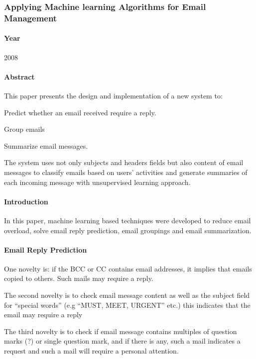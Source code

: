\documentclass[12pt]{article}
\newenvironment{my_itemize}
{\begin{itemize}
  \setlength{\itemsep}{0cm}
  \setlength{\parskip}{0cm}}
{\end{itemize}}
\begin{document}

\subsubsection{Applying Machine learning Algorithms for Email Management \cite{mous03}}
\paragraph{Year} 2008

\paragraph{Abstract}
This paper presents the design and implementation of a new system to:
\begin{my_itemize}
 \item Predict whether an email received require a reply.
 \item Group emails
 \item Summarize email messages.
\end{my_itemize}
The system uses not only subjects and headers fields but also content of email messages to classify emails based on users’ activities and generate summaries of each incoming message with unsupervised learning approach.

\paragraph{Introduction}
\begin{my_itemize}
 \item In this paper, machine learning based techniques were developed to reduce email overload, solve email  reply prediction, email groupings and email summarization.
\end{my_itemize}

\paragraph{Email Reply Prediction}
\begin{my_itemize}
 \item One novelty is: if the BCC or CC contains email addresses, it implies that emails copied to others. Such mails may require a reply.
 \item The second novelty is to check email message content as well as the subject field for “special words” (e.g “MUST, MEET, URGENT” etc.) this indicates that the email may require a reply
 \item The third novelty is to check if email message contains multiples of question marks (?) or single question mark, and if there is any, such a mail indicates a request and such a mail will require a personal attention.
\end{my_itemize}
\end{document}
